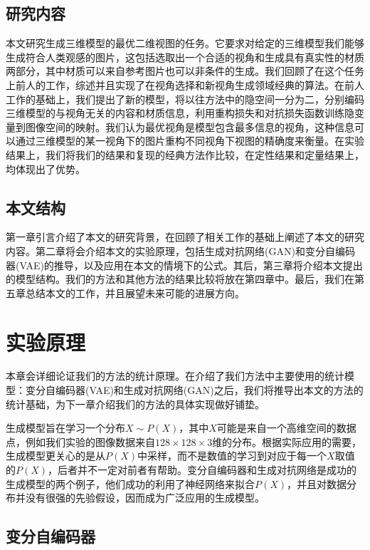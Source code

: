 \documentclass[UTF8,openany,AutoFakeBold,AutoFakeSlant,cs4size]{ctexbook}
\begin{document}
\section{研究内容}

本文研究生成三维模型的最优二维视图的任务。它要求对给定的三维模型我们能够生成符合人类观感的图片，这包括选取出一个合适的视角和生成具有真实性的材质两部分，其中材质可以来自参考图片也可以非条件的生成。我们回顾了在这个任务上前人的工作，综述并且实现了在视角选择和新视角生成领域经典的算法。在前人工作的基础上，我们提出了新的模型，将以往方法中的隐空间一分为二，分别编码三维模型的与视角无关的内容和材质信息，利用重构损失和对抗损失函数训练隐变量到图像空间的映射。我们认为最优视角是模型包含最多信息的视角，这种信息可以通过三维模型的某一视角下的图片重构不同视角下视图的精确度来衡量。在实验结果上，我们将我们的结果和复现的经典方法作比较，在定性结果和定量结果上，均体现出了优势。

\section{本文结构}

第一章引言介绍了本文的研究背景，在回顾了相关工作的基础上阐述了本文的研究内容。第二章将会介绍本文的实验原理，包括生成对抗网络(GAN)和变分自编码器(VAE)的推导，以及应用在本文的情境下的公式。其后，第三章将介绍本文提出的模型结构。我们的方法和其他方法的结果比较将放在第四章中。最后，我们在第五章总结本文的工作，并且展望未来可能的进展方向。



\clearpage

\chapter{实验原理}

本章会详细论证我们的方法的统计原理。在介绍了我们方法中主要使用的统计模型：变分自编码器(VAE)和生成对抗网络(GAN)之后，我们将推导出本文的方法的统计基础，为下一章介绍我们的方法的具体实现做好铺垫。

生成模型旨在学习一个分布$X \sim P(X)$，其中$X$可能是来自一个高维空间的数据点，例如我们实验的图像数据来自$128 \times 128 \times 3$维的分布。根据实际应用的需要，生成模型更关心的是从$P(X)$中采样，而不是数值的学习到对应于每一个$X$取值的$P(X)$，后者并不一定对前者有帮助。变分自编码器和生成对抗网络是成功的生成模型的两个例子，他们成功的利用了神经网络来拟合$P(X)$，并且对数据分布并没有很强的先验假设，因而成为广泛应用的生成模型。

\section{变分自编码器}
\end{document}
